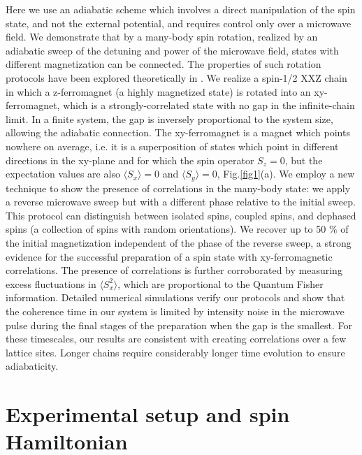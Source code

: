 \documentclass[12pt]{iopart}
\begin{document}
Here we use an adiabatic scheme which involves a direct manipulation of the spin state, and not the external potential, and requires control only over a microwave field. We demonstrate that by a many-body spin rotation, realized by an adiabatic sweep of the detuning and power of the microwave field, states with different magnetization can be connected. The properties of such rotation protocols have been explored theoretically in \cite{araceli20,araceli20b}. We realize a spin-1/2 XXZ chain in which a z-ferromagnet (a highly magnetized state) is rotated into an xy-ferromagnet, which is a strongly-correlated state with no gap in the infinite-chain limit. In a finite system, the gap is inversely proportional to the system size, allowing the adiabatic connection. The xy-ferromagnet is a magnet which points nowhere on average, i.e. it is a superposition of states which point in different directions in the xy-plane and for which the spin operator $S_z = 0$, but the expectation values are also $\langle S_x \rangle = 0$ and $\langle S_y \rangle = 0$, Fig.\ref{fig1}(a). We employ a new technique to show the presence of correlations in the many-body state: we apply a reverse microwave sweep but with a different phase relative to the initial sweep. This protocol can distinguish between isolated spins, coupled spins, and dephased spins (a collection of spins with random orientations). We recover up to 50 $\%$ of the initial magnetization independent of the phase of the reverse sweep, a strong evidence for the successful preparation of a spin state with xy-ferromagnetic correlations. The presence of correlations is further corroborated by measuring excess fluctuations in $\langle S_x^2 \rangle$, which are proportional to the Quantum Fisher information. Detailed numerical simulations verify our protocols and show that the coherence time in our system is limited by intensity noise in the microwave pulse during the final stages of the preparation when the gap is the smallest. For these timescales, our results are consistent with creating correlations over a few lattice sites. Longer chains require considerably longer time evolution to ensure adiabaticity.


\section{Experimental setup and spin Hamiltonian}
\end{document}
